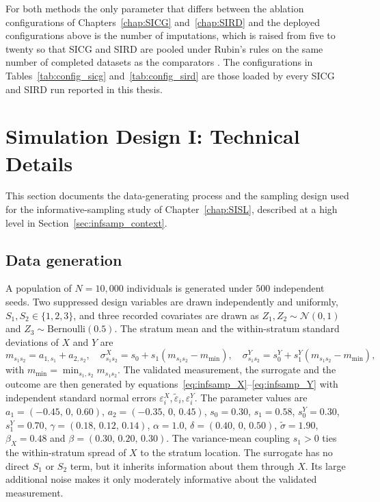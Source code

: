 For both methods the only parameter that differs between the ablation configurations of Chapters~\ref{chap:SICG} and~\ref{chap:SIRD} and the deployed configurations above is the number of imputations, which is raised from five to twenty so that SICG and SIRD are pooled under Rubin's rules on the same number of completed datasets as the comparators \citep{Rubin1987, deng2024multiple}. The configurations in Tables~\ref{tab:config_sicg} and~\ref{tab:config_sird} are those loaded by every SICG and SIRD run reported in this thesis.

\section{Simulation Design I: Technical Details}
\label{app:infsamp}

This section documents the data-generating process and the sampling design used for the informative-sampling study of Chapter~\ref{chap:SISL}, described at a high level in Section~\ref{sec:infsamp_context}.

\subsection{Data generation}

A population of $N = 10{,}000$ individuals is generated under $500$ independent seeds. Two suppressed design variables are drawn independently and uniformly, $S_1, S_2 \in \{1, 2, 3\}$, and three recorded covariates are drawn as $Z_1, Z_2 \sim \mathcal{N}(0, 1)$ and $Z_3 \sim \mathrm{Bernoulli}(0.5)$. The stratum mean and the within-stratum standard deviations of $X$ and $Y$ are
\begin{equation}
m_{s_1 s_2} = a_{1, s_1} + a_{2, s_2}, \quad
\sigma^X_{s_1 s_2} = s_0 + s_1 (m_{s_1 s_2} - m_{\min}), \quad
\sigma^Y_{s_1 s_2} = s_0^Y + s_1^Y (m_{s_1 s_2} - m_{\min}),
\end{equation}
with $m_{\min} = \min_{s_1, s_2} m_{s_1 s_2}$. The validated measurement, the surrogate and the outcome are then generated by equations~\eqref{eq:infsamp_X}--\eqref{eq:infsamp_Y} with independent standard normal errors $\varepsilon^X_i, \tilde{\varepsilon}_i, \varepsilon^Y_i$. The parameter values are $a_1 = (-0.45,\, 0,\, 0.60)$, $a_2 = (-0.35,\, 0,\, 0.45)$, $s_0 = 0.30$, $s_1 = 0.58$, $s_0^Y = 0.30$, $s_1^Y = 0.70$, $\gamma = (0.18,\, 0.12,\, 0.14)$, $\alpha = 1.0$, $\delta = (0.40,\, 0,\, 0.50)$, $\tilde{\sigma} = 1.90$, $\beta_X = 0.48$ and $\beta = (0.30,\, 0.20,\, 0.30)$. The variance-mean coupling $s_1 > 0$ ties the within-stratum spread of $X$ to the stratum location. The surrogate has no direct $S_1$ or $S_2$ term, but it inherits information about them through $X$. Its large additional noise makes it only moderately informative about the validated measurement.

